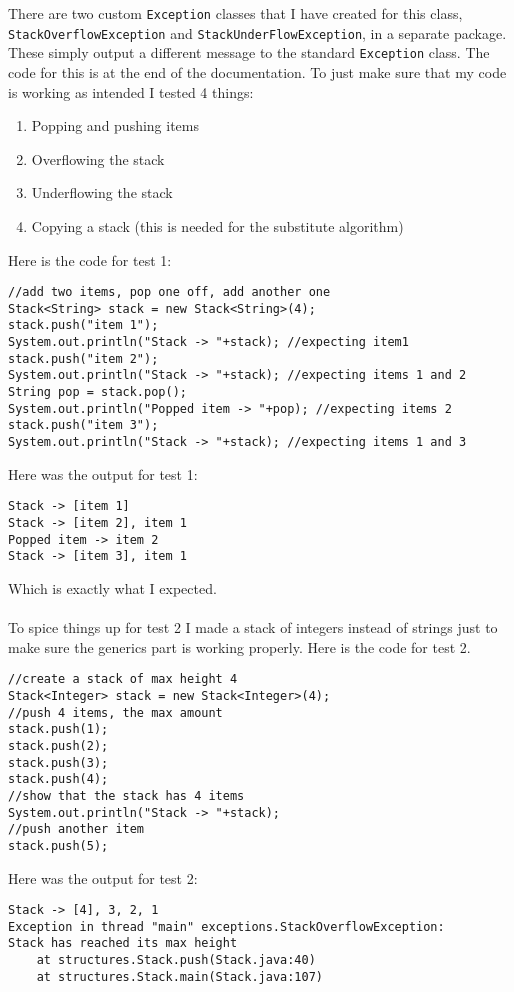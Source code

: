 \documentclass[../../../../../main.tex]{subfiles}
\begin{document}
There are two custom \texttt{Exception} classes that I have created for this class, \texttt{StackOverflowException} and \texttt{StackUnderFlowException}, in a separate package. These simply output a different message to the standard \texttt{Exception} class. The code for this is at the end of the documentation.
\newpage
\noindent
To just make sure that my code is working as intended I tested 4 things:
\begin{enumerate}
\item Popping and pushing items
\item Overflowing the stack
\item Underflowing the stack
\item Copying a stack (this is needed for the substitute algorithm)
\end{enumerate}
Here is the code for test 1:
\begin{verbatim}
//add two items, pop one off, add another one
Stack<String> stack = new Stack<String>(4);
stack.push("item 1");
System.out.println("Stack -> "+stack); //expecting item1
stack.push("item 2");
System.out.println("Stack -> "+stack); //expecting items 1 and 2
String pop = stack.pop();
System.out.println("Popped item -> "+pop); //expecting items 2
stack.push("item 3");
System.out.println("Stack -> "+stack); //expecting items 1 and 3
\end{verbatim}
Here was the output for test 1:
\begin{verbatim}
Stack -> [item 1]
Stack -> [item 2], item 1
Popped item -> item 2
Stack -> [item 3], item 1
\end{verbatim}
Which is exactly what I expected.\\ \\
To spice things up for test 2 I made a stack of integers instead of strings just to make sure the generics part is working properly. Here is the code for test 2.
\begin{verbatim}
//create a stack of max height 4
Stack<Integer> stack = new Stack<Integer>(4);
//push 4 items, the max amount
stack.push(1);
stack.push(2);
stack.push(3);
stack.push(4);
//show that the stack has 4 items
System.out.println("Stack -> "+stack);
//push another item
stack.push(5);
\end{verbatim}
Here was the output for test 2:
\begin{verbatim}
Stack -> [4], 3, 2, 1
Exception in thread "main" exceptions.StackOverflowException:
Stack has reached its max height
	at structures.Stack.push(Stack.java:40)
	at structures.Stack.main(Stack.java:107)
\end{verbatim}
\end{document}
